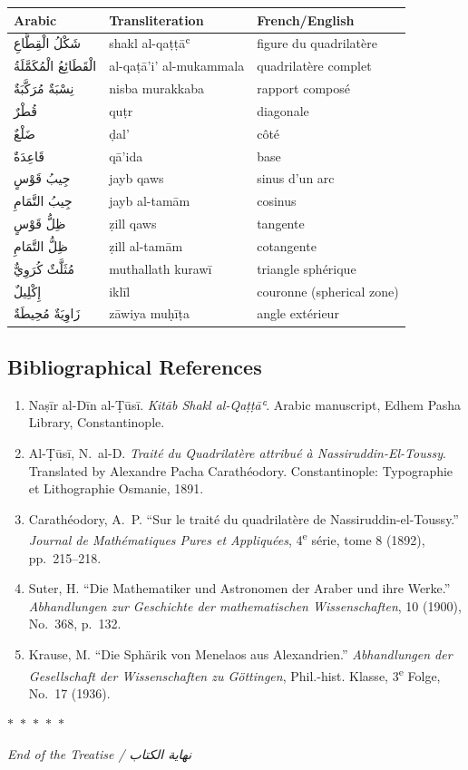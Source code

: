 \documentclass[11pt,a4paper]{article}
\theoremstyle{plain}
\theoremstyle{definition}
\theoremstyle{remark}
\newcommand{\ar}[1]{{\arabicfont\beginR #1\endR}}
\newcommand{\dblornament}{\begin{center}\textcolor{goldaccent}{$\ast$~$\ast$~$\ast$~$\ast$~$\ast$}\end{center}}
\begin{document}
\begin{center}
\begin{longtable}{lll}
\toprule
\textbf{Arabic} & \textbf{Transliteration} & \textbf{French/English} \\
\midrule
\endhead
\ar{شَكْلُ الْقِطَّاعِ} & shakl al-qaṭṭāʿ & figure du quadrilatère \\
\ar{الْقَطَائِعُ الْمُكَمَّلَةُ} & al-qaṭā'i' al-mukammala & quadrilatère complet \\
\ar{نِسْبَةٌ مُرَكَّبَةٌ} & nisba murakkaba & rapport composé \\
\ar{قُطْرٌ} & quṭr & diagonale \\
\ar{ضَلْعٌ} & ḍal' & côté \\
\ar{قَاعِدَةٌ} & qā'ida & base \\
\ar{جِيبُ قَوْسٍ} & jayb qaws & sinus d'un arc \\
\ar{جِيبُ التَّمَامِ} & jayb al-tamām & cosinus \\
\ar{ظِلُّ قَوْسٍ} & ẓill qaws & tangente \\
\ar{ظِلُّ التَّمَامِ} & ẓill al-tamām & cotangente \\
\ar{مُثَلَّثٌ كُرَوِيٌّ} & muthallath kurawī & triangle sphérique \\
\ar{إِكْلِيلٌ} & iklīl & couronne (spherical zone) \\
\ar{زَاوِيَةٌ مُحِيطَةٌ} & zāwiya muḥīṭa & angle extérieur \\
\bottomrule
\end{longtable}
\end{center}

\subsection*{Bibliographical References}

\begin{enumerate}
\item Naṣīr al-Dīn al-Ṭūsī. \textit{Kitāb Shakl al-Qaṭṭāʿ}. Arabic manuscript, Edhem Pasha Library, Constantinople.
\item Al-Ṭūsī, N.~al-D. \textit{Traité du Quadrilatère attribué à Nassiruddin-El-Toussy}. Translated by Alexandre Pacha Carathéodory. Constantinople: Typographie et Lithographie Osmanie, 1891.
\item Carathéodory, A.~P. ``Sur le traité du quadrilatère de Nassiruddin-el-Toussy.'' \textit{Journal de Mathématiques Pures et Appliquées}, 4\textsuperscript{e} série, tome 8 (1892), pp.~215--218.
\item Suter, H. ``Die Mathematiker und Astronomen der Araber und ihre Werke.'' \textit{Abhandlungen zur Geschichte der mathematischen Wissenschaften}, 10 (1900), No.~368, p.~132.
\item Krause, M. ``Die Sphärik von Menelaos aus Alexandrien.'' \textit{Abhandlungen der Gesellschaft der Wissenschaften zu Göttingen}, Phil.-hist. Klasse, 3\textsuperscript{e} Folge, No.~17 (1936).
\end{enumerate}

\vspace{1cm}
\begin{center}
\dblornament\vspace{0.5cm}
{\small\textit{End of the Treatise / \ar{نهاية الكتاب}}}\\[0.3cm]

\end{center}
\end{document}
